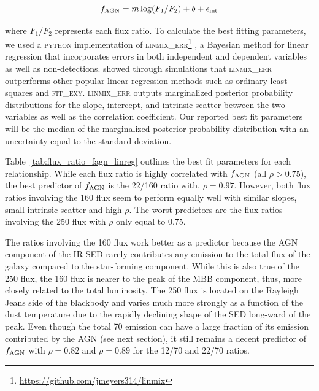 \documentclass[fleqn, usenatbib]{mnras}
\begin{document}
\begin{equation}
f_{\rm AGN} = m\log(F_{1}/F_{2}) + b + \epsilon_{\rm int}
\end{equation}

\noindent where $F_{1}/F_{2}$ represents each flux ratio. To calculate the best fitting parameters, we used a \textsc{python} implementation of \textsc{linmix\_err}\footnote{\url{https://github.com/jmeyers314/linmix}} \citep{Kelly:2007lr}, a Bayesian method for linear regression that incorporates errors in both independent and dependent variables as well as non-detections. \citet{Kelly:2007lr} showed through simulations that \textsc{linmix\_err} outperforms other popular linear regression methods such as ordinary least squares and \textsc{fit\_exy}. \textsc{linmix\_err} outputs marginalized posterior probability distributions for the slope, intercept, and intrinsic scatter between the two variables as well as the correlation coefficient. Our reported best fit parameters will be the median of the marginalized posterior probability distribution with an uncertainty equal to the standard deviation.

Table~\ref{tab:flux_ratio_fagn_linreg} outlines the best fit parameters for each relationship. While each flux ratio is highly correlated with $f_{\rm AGN}$ (all $\rho > 0.75$), the best predictor of $f_{\rm AGN}$ is the 22/160 ratio with, $\rho = 0.97$. However, both flux ratios involving the 160 \micron{} flux seem to perform equally well with similar slopes, small intrinsic scatter and high $\rho$. The worst predictors are the flux ratios involving the 250 \micron{} flux with $\rho$ only equal to 0.75. 

The ratios involving the 160 \micron{} flux work better as a predictor because the AGN component of the IR SED rarely contributes any emission to the total flux of the galaxy compared to the star-forming component. While this is also true of the 250 \micron{} flux, the 160 \micron{} flux is nearer to the peak of the MBB component, thus, more closely related to the total luminosity. The 250 \micron{} flux is located on the Rayleigh Jeans side of the blackbody and varies much more strongly as a function of the dust temperature due to the rapidly declining shape of the SED long-ward of the peak. Even though the total 70 \micron{} emission can have a large fraction of its emission contributed by the AGN (see next section), it still remains a decent predictor of $f_{\rm AGN}$ with $\rho = 0.82$ and $\rho=0.89$ for the 12/70 and 22/70 \micron{} ratios. 
\end{document}
